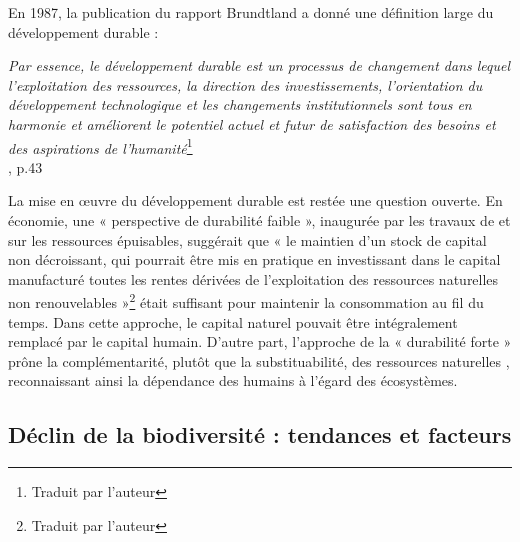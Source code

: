 \clearpage
\begin{tcolorbox}[breakable,  
colback=verylightgray, 
colframe=gray!75!black, 
title= {Box 1 - Soutenabilité Faible et Forte},
fontupper=\small]

\par %
\justifying %

En 1987, la publication du rapport Brundtland \citep{brundtland} a donné une définition large du développement durable : 

\begin{displayquote}
\textit{Par essence, le développement durable est un processus de changement dans lequel l'exploitation des ressources, la direction des investissements, l'orientation du développement technologique et les changements institutionnels sont tous en harmonie et améliorent le potentiel actuel et futur de satisfaction des besoins et des aspirations de l'humanité}\footnote{Traduit par l'auteur}\\
\hspace*{\fill}\small{\cite{brundtland}, p.43}
\end{displayquote}

La mise en œuvre du développement durable est restée une question ouverte. En économie, une « perspective de durabilité faible », inaugurée par les travaux de \cite{hartwick_intergenerational_1977} et \cite{solow_intergenerational_1986} sur les ressources épuisables, suggérait que « le maintien d'un stock de capital non décroissant, qui pourrait être mis en pratique en investissant dans le capital manufacturé toutes les rentes dérivées de l'exploitation des ressources naturelles non renouvelables »\footnote{Traduit par l'auteur} \citep{gomez_history_2010} était suffisant pour maintenir la consommation au fil du temps. Dans cette approche, le capital naturel pouvait être intégralement remplacé par le capital humain. D'autre part, l'approche de la « durabilité forte » prône la complémentarité, plutôt que la substituabilité, des ressources naturelles \citep{costanza_daly}, reconnaissant ainsi la dépendance des humains à l'égard des écosystèmes.
\end{tcolorbox}

{}
\subsection*{Déclin de la biodiversité : tendances et facteurs}

